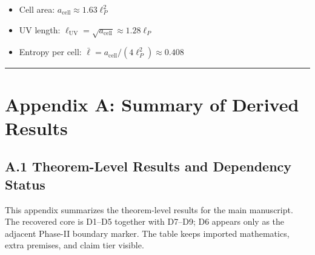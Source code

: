\begin{itemize}
\tightlist
\item
 Cell area: \(a_{\text{cell}} \approx 1.63 \ell_P^2\)
\item
 UV length: \(\ell_{\text{UV}} = \sqrt{a_{\text{cell}}} \approx 1.28 \ell_P\)
\item
 Entropy per cell: \(\bar{\ell} = a_{\text{cell}}/(4\ell_P^2) \approx 0.408\)
\end{itemize}

\begin{center}\rule{0.5\linewidth}{0.5pt}\end{center}

\section{Appendix A: Summary of Derived Results}\label{appendix-a-summary-of-derived-results}

\subsection{A.1 Theorem-Level Results and Dependency Status}\label{a1-theorem-level-results}

This appendix summarizes the theorem-level results for the main manuscript. The recovered core is D1--D5 together with D7--D9; D6 appears only as the adjacent Phase-II boundary marker. The table keeps imported mathematics, extra premises, and claim tier visible.

